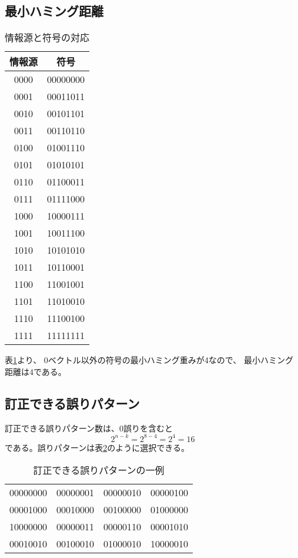 \documentclass[a4paper,11pt]{jsarticle}
\begin{document}
\subsection{最小ハミング距離}

\begin{table}[hbtp]
  \caption{情報源と符号の対応}
  \label{table:all-code}
  \centering
  \begin{tabular}{|cc|}
    \hline
    情報源 & 符号 \\ \hline \hline
    0000 & 00000000 \\ \hline
    0001 & 00011011 \\ \hline
    0010 & 00101101 \\ \hline
    0011 & 00110110 \\ \hline
    0100 & 01001110 \\ \hline
    0101 & 01010101 \\ \hline
    0110 & 01100011 \\ \hline
    0111 & 01111000 \\ \hline
    1000 & 10000111 \\ \hline
    1001 & 10011100 \\ \hline
    1010 & 10101010 \\ \hline
    1011 & 10110001 \\ \hline
    1100 & 11001001 \\ \hline
    1101 & 11010010 \\ \hline
    1110 & 11100100 \\ \hline
    1111 & 11111111 \\ \hline
  \end{tabular}
\end{table}

表\ref{table:all-code}より、
0ベクトル以外の符号の最小ハミング重みが4なので、
最小ハミング距離は4である。

\subsection{訂正できる誤りパターン}
訂正できる誤りパターン数は、0誤りを含むと
\begin{equation*}
  2^{n-k}=2^{8-4}=2^4=16
\end{equation*}
である。誤りパターンは表\ref{table:error-pattern}のように選択できる。

\begin{table}[hbtp]
  \caption{訂正できる誤りパターンの一例}
  \label{table:error-pattern}
  \centering
  \begin{tabular}{cccc}
    00000000 & 00000001 & 00000010 & 00000100 \\
    00001000 & 00010000 & 00100000 & 01000000 \\
    10000000 & 00000011 & 00000110 & 00001010 \\
    00010010 & 00100010 & 01000010 & 10000010
  \end{tabular}
\end{table}
\end{document}
